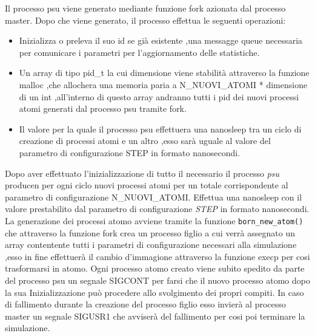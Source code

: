 Il processo psu viene generato mediante funzione fork azionata dal processo master.
Dopo che viene generato, il processo effettua le seguenti operazioni:
\begin{itemize}
    \item Inizializza o preleva il suo id se già esistente ,una messagge queue necessaria per comunicare i parametri per l'aggiornamento delle statistiche. 
    \item Un array di tipo pid\_t la cui dimensione viene stabilità attraverso la funzione malloc ,che allochera una memoria paria a N\_NUOVI\_ATOMI * dimensione di un int ,all'interno di questo array andranno tutti i pid dei nuovi processi atomi generati dal processo psu tramite fork. 
    \item Il valore per la quale il processo psu effettuera una nanosleep tra un ciclo di creazione di processi atomi e un altro ,esso sarà uguale al valore del parametro di configurazione STEP in formato nanosecondi.
\end{itemize}
Dopo aver effettuato l'inizializzazione di tutto il necessario il processo \textit{psu} producen per ogni ciclo nuovi processi atomi per un totale corrispondente al parametro di configurazione N\_NUOVI\_ATOMI.
Effettua una nanosleep con il valore prestabilito dal parametro di configurazione \textit{STEP} in formato nanosecondi.
La generazione dei processi atomo avviene tramite la funzione \lstinline|born_new_atom()| che attraverso la funzione fork crea un processo figlio a cui verrà assegnato un array contentente tutti i parametri di configurazione necessari alla simulazione ,esso in fine effettuerà il cambio d'immagione attraverso la funzione execp per cosi trasformarsi in atomo.
Ogni processo atomo creato viene subito spedito da parte del processo psu un segnale SIGCONT per farsi che il nuovo processo atomo dopo la sua Inizializzazione può procedere allo svolgimento dei propri compiti. 
In caso di fallimento durante la creazione del processo figlio esso invierà al processo master un segnale SIGUSR1 che avviserà del fallimento per cosi poi terminare la simulazione. 